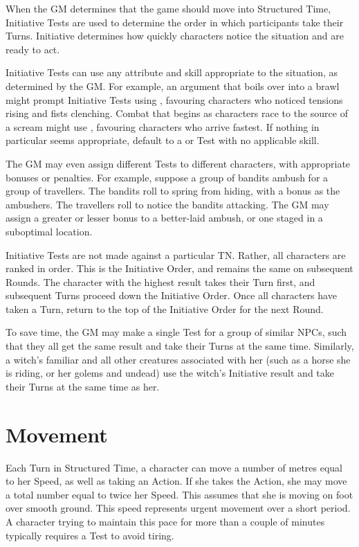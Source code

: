When the GM determines that the game should move into Structured Time, Initiative Tests are used to determine the order in which participants take their Turns.
Initiative determines how quickly characters notice the situation and are ready to act.

Initiative Tests can use any attribute and skill appropriate to the situation, as determined by the GM.
For example, an argument that boils over into a brawl might prompt Initiative Tests using , favouring characters who noticed tensions rising and fists clenching.
Combat that begins as characters race to the source of a scream might use , favouring characters who arrive fastest.
If nothing in particular seems appropriate, default to a  or  Test with no applicable skill.

The GM may even assign different Tests to different characters, with appropriate bonuses or penalties.
For example, suppose a group of bandits ambush for a group of travellers.
The bandits roll  to spring from hiding, with a  bonus as the ambushers.
The travellers roll  to notice the bandits attacking.
The GM may assign a greater or lesser bonus to a better-laid ambush, or one staged in a suboptimal location.

Initiative Tests are not made against a particular TN.
Rather, all characters are ranked in order.
This is the Initiative Order, and remains the same on subsequent Rounds.
The character with the highest result takes their Turn first, and subsequent Turns proceed down the Initiative Order.
Once all characters have taken a Turn, return to the top of the Initiative Order for the next Round.

To save time, the GM may make a single Test for a group of similar NPCs, such that they all get the same result and take their Turns at the same time.
Similarly, a witch's familiar and all other creatures associated with her (such as a horse she is riding, or her golems and undead) use the witch's Initiative result and take their Turns at the same time as her.

\section{Movement}

Each Turn in Structured Time, a character can move a number of metres equal to her Speed, as well as taking an Action.
If she takes the  Action, she may move a total number equal to twice her Speed.
This assumes that she is moving on foot over smooth ground.
This speed represents urgent movement over a short period.
A character trying to maintain this pace for more than a couple of minutes typically requires a  Test to avoid tiring.


